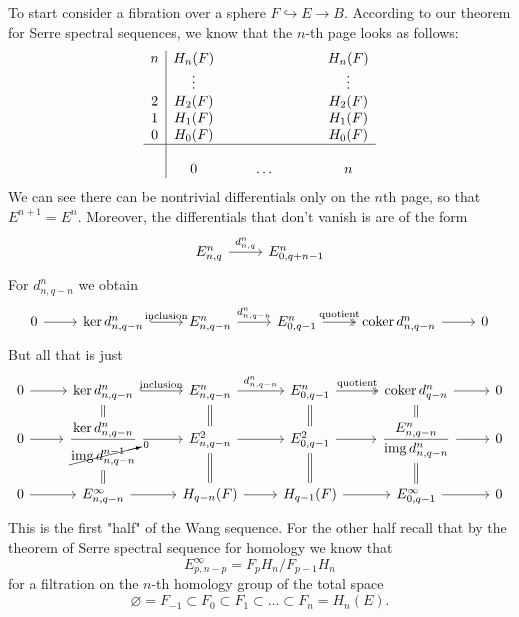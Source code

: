 \documentclass{article}
\numberwithin{equation}{section}
\DeclareMathOperator{\img}{img}
\begin{document}
To start consider a fibration over a sphere $F\hookrightarrow E\to B$. According to our theorem for Serre spectral sequences, we know that the $n$-th page looks as follows:
\begin{align*}
\begin{array}{c|cccccccc}
	n&H_n(F)&&&&&&&H_{n}(F)\\
	 &\vdots&&&&&&&\vdots\\
	2&H_2(F)&&&&&&&H_2(F)\\
	1&H_1(F)&&&&&&&H_1(F)\\
	0&H_0(F)&&&&&&&H_0(F)\\
	\hline\\
	 &0&&&\ldots&&&&n
\end{array}
\end{align*}
We can see there can be nontrivial differentials only on the $n$th page, so that $E^{n+1}=E^n$. Moreover, the differentials that don't vanish is are of the form
\[\begin{tikzcd}
E^n_{n,q}\arrow[r,"d^n_{n,q}"]&E^n_{0,q+n-1}
\end{tikzcd}\]
For $d_{n,q-n}^n$ we obtain
\[\begin{tikzcd}
	0\arrow[r]&\ker d^n_{n,q-n}\arrow[r,"\text{inclusion} ",hook]&E^n_{n,q-n}\arrow[r,"d^n_{n,q-n}"]&E^n_{0,q-1}\arrow[r,"\text{quotient}",two heads]&\operatorname{coker}d^n_{n,q-n}\arrow[r]&0
\end{tikzcd}\]
But all that is just
\[\begin{tikzcd}[row sep=small]
	0\arrow[r]&\ker d^n_{n,q-n}\arrow[r,"\text{inclusion} ",hook]\arrow[d,equals]&E^n_{n,q-n}\arrow[r,"d^n_{n,q-n}"]\arrow[d,equals]&E^n_{0,q-1}\arrow[r,"\text{quotient}",two heads]\arrow[d,equals]&\operatorname{coker}d^n_{q-n}\arrow[r]\arrow[d,equals]&0\\
	0\arrow[r]&\dfrac{\ker d^n_{n,q-n}}{\cancelto{0}{\img d^{n-1}_{n,q-n}}}\arrow[r]\arrow[d,equals]&E^2_{n,q-n}\arrow[r]\arrow[d,equals]&E^2_{0,q-1}\arrow[r]\arrow[d,equals]&\dfrac{E^n_{n,q-n}}{\img d^n_{n,q-n}} \arrow[d,equals]\arrow[r]&0\\
	0\arrow[r]&E^\infty_{n,q-n}\arrow[r]&H_{q-n}(F)\arrow[r]&H_{q-1}(F)\arrow[r]&E^{\infty}_{0,q-1}\arrow[r]&0
\end{tikzcd}\]
This is the first "half" of the Wang sequence. For the other half recall that by the theorem of Serre spectral sequence for homology we know that
\[E^{\infty}_{p,n-p}=F_pH_n/F_{p-1}H_n\]
for a filtration on the $n$-th homology group of the total space 
\[\varnothing=F_{-1}\subset F_0 \subset F_1\subset \ldots\subset F_n=H_{n}(E).\]
\end{document}
